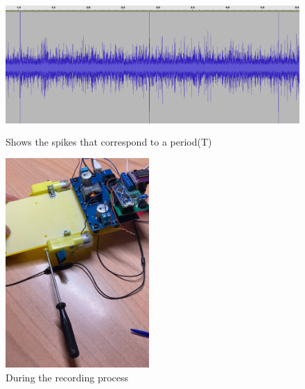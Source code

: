 \documentclass[a4paper]{article}
\begin{document}

\begin{figure}[H]
\begin{Center}
\advance\leftskip 0.23in		
    \includegraphics[width=5.06in,height=2.02in]{./media/image2.png}
	\caption{Shows the spikes that correspond to a period(T)}
		\label{Shows the spikes that correspond to a period(T)}
\end{Center}
\end{figure}







\begin{figure}[H]
	\begin{Center}
		\includegraphics[width=2.16in,height=3.15in]{./media/image1.jpeg}
		\caption{During the recording process}
		\label{figDuring_the_process_of_recording}
	\end{Center}
\end{figure}


\end{document}
